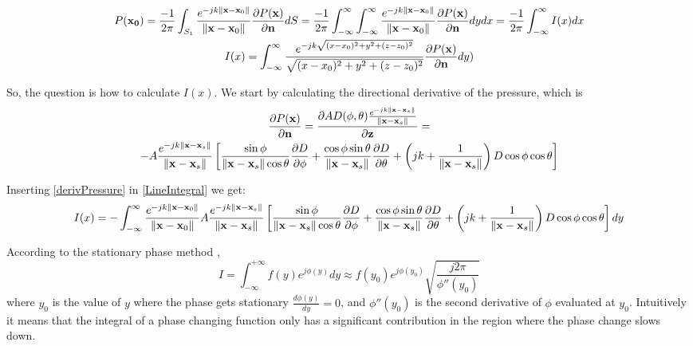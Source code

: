 \begin{gather}
P(\mathbf{x_0}) = \frac{-1}{2\pi} \int_{S_1} \frac{e^{-jk\left\| \mathbf{x} - \mathbf{x}_0 \right\|}}{\left\| \mathbf{x} - \mathbf{x}_0 \right\|} \frac{\partial P(\mathbf{x})}{\partial \mathbf{n}} dS = \frac{-1}{2\pi} \int_{-\infty}^{\infty} \int_{-\infty}^{\infty} \frac{e^{-jk\left\| \mathbf{x} - \mathbf{x}_0 \right\|}}{\left\| \mathbf{x} - \mathbf{x}_0 \right\|} \frac{\partial P(\mathbf{x})}{\partial \mathbf{n}} dy dx = \frac{-1}{2\pi} \int_{-\infty}^{\infty} I(x) dx \\
I(x) = \int_{-\infty}^{\infty} \frac{e^{-jk\sqrt{(x - x_0)^2 + y^2 + (z-z_0)^2}}}{\sqrt{(x - x_0)^2 + y^2 + (z-z_0)^2}} \frac{\partial P(\mathbf{x})}{\partial \mathbf{n}} dy
\label{LineIntegral})
\end{gather}

So, the question is how to calculate $I(x)$. We start by calculating the directional derivative of the pressure, which is \cite{Verheijen}
\begin{multline}
\frac{\partial P(\vec{x})}{\partial \mathbf{n}} = \frac{\partial \coef \Diag(\phi, \theta) \GreenFunc[\vec{x} - \vec{x}_s]}{\partial \mathbf{z}} = \\ -A \GreenFunc[\vec{x} - \vec{x}_s] \left[ \frac{\sin\phi}{\norm{\vec{x} - \vec{x}_s}\cos\theta}\frac{\partial\Diag}{\partial\phi} + \frac{\cos\phi \sin\theta}{\norm{\vec{x} - \vec{x}_s}} \frac{\partial\Diag}{\partial\theta} + \left(jk + \frac{1}{\norm{\vec{x} - \vec{x}_s}}\right) \Diag \cos\phi \cos\theta \right]
\label{derivPressure}
\end{multline}

Inserting \autoref{derivPressure} in \autoref{LineIntegral} we get:
\begin{equation}
I(x) = -\int_{-\infty}^{\infty} \GreenFunc[\vec{x} - \vec{x}_0] A \GreenFunc[\vec{x} - \vec{x}_s] \left[ \frac{\sin\phi}{\norm{\vec{x} - \vec{x}_s}\cos\theta}\frac{\partial\Diag}{\partial\phi} + \frac{\cos\phi \sin\theta}{\norm{\vec{x} - \vec{x}_s}} \frac{\partial\Diag}{\partial\theta} + \left(jk + \frac{1}{\norm{\vec{x} - \vec{x}_s}}\right) \Diag \cos\phi \cos\theta \right] dy
\label{integrateY}
\end{equation}

According to the stationary phase method \cite{Verheijen},
\begin{equation}
I = \int_{-\infty}^{+\infty} f(y) e^{j\phi(y)} dy \approx f(y_0) e^{j\phi(y_0)} \sqrt{\frac{j 2\pi}{\phi''(y_0)}}
\end{equation}
where $y_0$ is the value of $y$ where the phase gets stationary $\frac{d\phi(y)}{dy} = 0$, and $\phi''(y_0)$ is the second derivative of $\phi$ evaluated at $y_0$. Intuitively it means that the integral of a phase changing function only has a significant contribution in the region where the phase change slows down.

